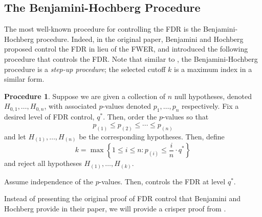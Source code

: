 \documentclass[11pt,reqno]{report}
\theoremstyle{definition}
\newtheorem{proc}[theorem]{Procedure}
\numberwithin{equation}{section}
\begin{document}
\subsection{The Benjamini-Hochberg Procedure}
The most well-known procedure for controlling the FDR is the Benjamini-Hochberg procedure. Indeed, in the original paper, Benjamini and Hochberg proposed control the FDR in lieu of the FWER, and introduced the following procedure that controls the FDR. Note that similar to , the Benjamini-Hochberg procedure is a \emph{step-up procedure}; the selected cutoff $k$ is a maximum index in a similar form. 
\begin{proc}
\label{bhproc}
Suppose we are given a collection of $n$ null hypotheses, denoted $H_{0, 1}, \ldots, H_{0, n}$, with associated $p$-values denoted $p_1, \ldots, p_n$ respectively. Fix a desired level of FDR control, $q^*$. Then, order the $p$-values so that
\[ p_{(1)} \leq p_{(2)} \leq \cdots \leq p_{(n)} \] and let $H_{(1)}, \ldots, H_{(n)}$ be the corresponding hypotheses. Then, define
\[ k = \max \left\{ 1 \leq i \leq n : p_{(i)} \leq \frac{i}{n} \cdot q^* \right \}  \] 
and reject all hypotheses $H_{(1)}, \ldots, H_{(k)}$.  
\end{proc}
\begin{prop}
Assume independence of the $p$-values. Then,  controls the FDR at level $q^*$.
\end{prop}
Instead of presenting the original proof of FDR control that Benjamini and Hochberg provide in their paper, we will provide a crisper proof from \cite{stat300}.
\end{document}
